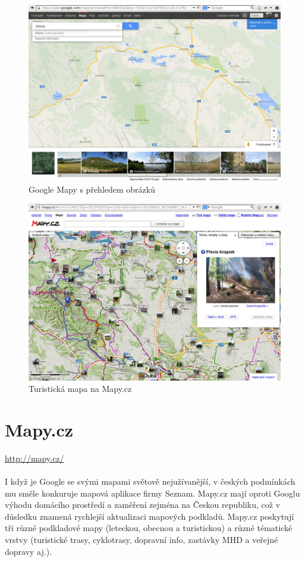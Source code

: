\documentclass[11pt,a4paper,titlepage,oneside]{book}
\begin{document}
		\begin{figure}[!h]
			\begin{center}
				\includegraphics[width=12cm]{obrazky/googleMaps.png}
				\caption{Google Mapy s přehledem obrázků}
			\end{center}
		\end{figure}

			\begin{figure}[!h]
				\begin{center}
					\includegraphics[width=12cm]{obrazky/mapycz.png}
					\caption{Turistická mapa na Mapy.cz}
				\end{center}
			\end{figure}

	\section{Mapy.cz}
		\url{http://mapy.cz/}
		\paragraph{} I když je Google se svými mapami světově nejužívanější, v českých pod\-mínkách mu směle konkuruje mapová aplikace firmy Seznam. Mapy.cz mají oproti Googlu výhodu domácího prostředí a zaměření zejména na Českou republiku, což v důsledku znamená rychlejší aktualizaci mapových podkladů. Mapy.cz poskytují tři různé podkladové mapy (leteckou, obecnou a turistickou) a různé tématické vrstvy (turistické trasy, cyklotrasy, dopravní info, zastávky MHD a veřejné dopravy aj.). 
\end{document}
